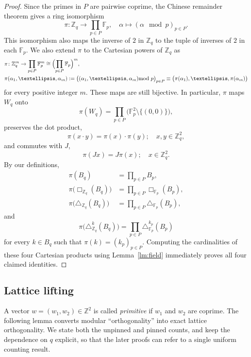 \documentclass[10pt,a4paper]{amsart}
\numberwithin{equation}{section}
\begin{document}
\begin{proof}
Since the primes in $P$ are pairwise coprime, the Chinese
remainder theorem gives a ring isomorphism
\[ \pi\colon\mathbb{Z}_q\to \prod_{p\in P}\mathbb{F}_p,
\quad \alpha\mapsto (\alpha\!\!\!\!\mod p)_{p\in P}. \]
This isomorphism also maps the inverse of $2$ in $\mathbb{Z}_q$ to the tuple of inverses of $2$ in each $\mathbb{F}_p$.
We also extend $\pi$ to the Cartesian powers of $\mathbb{Z}_q$ as
\begin{align*} 
& \pi\colon\mathbb{Z}_q^m\to \prod_{p\in P}\mathbb{F}_p^m \cong \Bigl(\prod_{p\in P}\mathbb{F}_p\Bigr)^m, \\
& \pi(\alpha_1,\ldots,\alpha_m) := \bigl((\alpha_1,\ldots,\alpha_m)\!\!\!\!\mod p\bigr)_{p\in P} \equiv \big(\pi(\alpha_1),\ldots,\pi(\alpha_m)\big)
\end{align*}
for every positive integer $m$.
These maps are still bijective. In particular, $\pi$ maps $W_q$ onto
\[ \pi(W_q) = \prod_{p\in P}\bigl(\mathbb{F}_p^2\setminus\{(0,0)\}\bigr), \]
preserves the dot product,
\[ \pi(x\cdot y) = \pi(x) \cdot \pi(y); \quad x,y\in\mathbb{Z}_q^2, \]
and commutes with $J$,
\[ \pi(Jx) = J\pi(x); \quad x\in\mathbb{Z}_q^2. \]
By our definitions,
\begin{align*}
\pi(B_q) & = \prod_{p\in P} B_p, \\
\pi\bigl(\Box_{\mathbb{Z}_q}(B_q)\bigr) & = \prod_{p\in P}\Box_{\mathbb{F}_p}(B_p), \\
\pi\bigl(\triangle_{\mathbb{Z}_q}(B_q)\bigr) & = \prod_{p\in P}\triangle_{\mathbb{F}_p}(B_p),
\end{align*}
and
\[ \pi\bigl(\triangle^k_{\mathbb{Z}_q}(B_q)\bigr) = \prod_{p\in P}\triangle^{k_p}_{\mathbb{F}_p}(B_p) \]
for every $k\in B_q$ such that $\pi(k)=(k_p)_{p\in P}$.
Computing the cardinalities of these four Cartesian products using Lemma~\ref{lm:field} immediately proves all four claimed identities.
\end{proof}


\subsection{Lattice lifting}

A vector $w=(w_1,w_2)\in\mathbb{Z}^2$ is called \emph{primitive} if $w_1$ and $w_2$ are coprime. The following lemma converts modular ``orthogonality'' into exact lattice orthogonality. We state both the unpinned and pinned counts, and keep the dependence on $q$ explicit, so that the later proofs can refer to a single uniform counting result.
\end{document}
